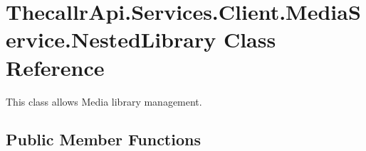 \hypertarget{class_thecallr_api_1_1_services_1_1_client_1_1_media_service_1_1_nested_library}{\section{Thecallr\+Api.\+Services.\+Client.\+Media\+Service.\+Nested\+Library Class Reference}
\label{class_thecallr_api_1_1_services_1_1_client_1_1_media_service_1_1_nested_library}
}


This class allows Media library management.  


\subsection*{Public Member Functions}
